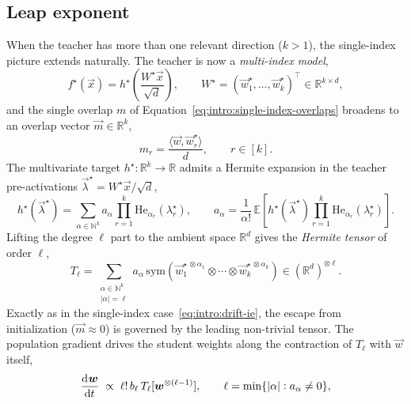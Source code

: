 \subsection{Leap exponent}
When the teacher has more than one relevant direction (\(k > 1\)), the single-index picture extends naturally. The teacher is now a \emph{multi-index model},
\begin{equation}
    \label{eq:intro:multi-index-teacher}
    f^\star(\vec{x}) = h^\star\!\left(\frac{W^\star \vec{x}}{\sqrt{d}}\right), \qquad W^\star = (\vec{w}^\star_1, \ldots, \vec{w}^\star_k)^\top \in \mathbb{R}^{k \times d},
\end{equation}
and the single overlap \(m\) of Equation~\eqref{eq:intro:single-index-overlaps} broadens to an overlap vector \(\vec{m} \in \mathbb{R}^k\),
\begin{equation}
    \label{eq:intro:multi-index-overlaps}
    m_r = \frac{\langle \vec{w}, \vec{w}^\star_r \rangle}{d}, \qquad r \in [k].
\end{equation}
The multivariate target \(h^\star : \mathbb{R}^k \to \mathbb{R}\) admits a Hermite expansion in the teacher pre-activations \(\vec{\lambda}^\star = W^\star \vec{x}/\sqrt{d}\),
\begin{equation}
    \label{eq:intro:multi-index-hermite}
    h^\star(\vec{\lambda}^\star) = \sum_{\alpha \in \mathbb{N}^k} a_\alpha \prod_{r=1}^k \mathrm{He}_{\alpha_r}(\lambda^\star_r), \qquad a_\alpha = \frac{1}{\alpha!}\,\mathbb{E}\!\left[h^\star(\vec{\lambda}^\star)\prod_{r=1}^k\mathrm{He}_{\alpha_r}(\lambda^\star_r)\right].
\end{equation}
Lifting the degree \(\ell\) part to the ambient space \(\mathbb{R}^d\) gives the \emph{Hermite tensor} of order \(\ell\),
\begin{equation}
    \label{eq:intro:hermite-tensor}
    T_\ell = \sum_{\substack{\alpha \in \mathbb{N}^k \\ |\alpha| = \ell}} a_\alpha \, \mathrm{sym}\!\left(\vec{w}^{\star\,\otimes\alpha_1}_1 \otimes \cdots \otimes \vec{w}^{\star\,\otimes\alpha_k}_k\right) \in (\mathbb{R}^d)^{\otimes \ell}.
\end{equation}
Exactly as in the single-index case~\eqref{eq:intro:drift-ie}, the escape from initialization (\(\vec{m} \approx 0\)) is governed by the leading non-trivial tensor. The population gradient drives the student weights along the contraction of \(T_\ell\) with \(\vec{w}\) itself,
\begin{equation}
    \label{eq:intro:leap-drift}
    \dod{\vec{w}}{t} \;\propto\; \ell!\,b_\ell\, T_\ell[\vec{w}^{\otimes(\ell-1)}],
    \qquad \ell = \min\{|\alpha| : a_\alpha \neq 0\},
\end{equation}
